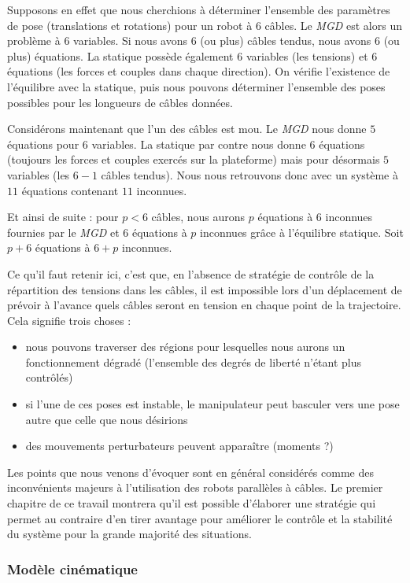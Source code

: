 Supposons en effet que nous cherchions à déterminer l'ensemble des paramètres de pose (translations et rotations) pour un robot à $6$ câbles. Le {\it MGD} est alors un problème à $6$ variables. Si nous avons 6 (ou plus) câbles tendus, nous avons $6$ (ou plus) équations. La statique possède également $6$ variables (les tensions) et $6$ équations (les forces et couples dans chaque direction). On vérifie l'existence de l'équilibre avec la statique, puis nous pouvons déterminer l'ensemble des poses possibles pour les longueurs de câbles données.

Considérons maintenant que l'un des câbles est mou. Le {\it MGD} nous donne $5$ équations pour $6$ variables. La statique par contre nous donne $6$ équations (toujours les forces et couples exercés sur la plateforme) mais pour désormais $5$ variables (les $6-1$ câbles tendus). Nous nous retrouvons donc avec un système à $11$ équations contenant $11$ inconnues.

Et ainsi de suite : pour $p < 6$ câbles, nous aurons $p$ équations à $6$ inconnues fournies par le {\it MGD} et $6$ équations à $p$ inconnues grâce à l'équilibre statique. Soit $p+6$ équations à $6+p$ inconnues.

Ce qu'il faut retenir ici, c'est que, en l'absence de stratégie de contrôle de la répartition des tensions dans les câbles, il est impossible lors d'un déplacement de prévoir à l'avance quels câbles seront en tension en chaque point de la trajectoire. Cela signifie trois choses :
\begin{itemize}
 \item nous pouvons traverser des régions pour lesquelles nous aurons un fonctionnement dégradé (l'ensemble des degrés de liberté n'étant plus contrôlés)
 \item si l'une de ces poses est instable, le manipulateur peut basculer vers une pose autre que celle que nous désirions
 \item des mouvements perturbateurs peuvent apparaître (moments ?)
\end{itemize}

Les points que nous venons d'évoquer sont en général considérés comme des inconvénients majeurs à l'utilisation des robots parallèles à câbles. Le premier chapitre de ce travail montrera qu'il est possible d'élaborer une stratégie qui permet au contraire d'en tirer avantage pour améliorer le contrôle et la stabilité du système pour la grande majorité des situations.

\subsubsection{Modèle cinématique}


